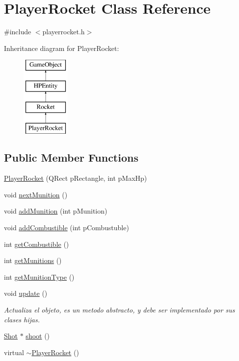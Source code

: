 \hypertarget{class_player_rocket}{\section{Player\-Rocket Class Reference}
\label{class_player_rocket}
}


{\ttfamily \#include $<$playerrocket.\-h$>$}

Inheritance diagram for Player\-Rocket\-:\begin{figure}[H]
\begin{center}
\leavevmode
\includegraphics[height=4.000000cm]{class_player_rocket}
\end{center}
\end{figure}
\subsection*{Public Member Functions}
\begin{DoxyCompactItemize}
\item 
\hyperlink{class_player_rocket_a662448cb29201a9155de519f4563fac3}{Player\-Rocket} (Q\-Rect p\-Rectangle, int p\-Max\-Hp)
\item 
void \hyperlink{class_player_rocket_a61a775b8b7f8bf920e748eaf44af1a49}{next\-Munition} ()
\item 
void \hyperlink{class_player_rocket_a93f9d838d9b21c11ab9a2fe0176f9ff6}{add\-Munition} (int p\-Munition)
\item 
void \hyperlink{class_player_rocket_ae7bf457ff4f9c794f9cf9f8cfadf4104}{add\-Combustible} (int p\-Combustuble)
\item 
int \hyperlink{class_player_rocket_a0761ec562eed1e41ea87bff255b73090}{get\-Combustible} ()
\item 
int \hyperlink{class_player_rocket_a1c7d7b49f3ba84be78aae03201ad338c}{get\-Munitions} ()
\item 
int \hyperlink{class_player_rocket_ab9f347b5080e6db3e20f79030f50f3d8}{get\-Munition\-Type} ()
\item 
void \hyperlink{class_player_rocket_a158f4ff0dd89fd4075688fa2b7d9e693}{update} ()
\begin{DoxyCompactList}\small\item\em Actualiza el objeto, es un metodo abstracto, y debe ser implementado por sus clases hijas. \end{DoxyCompactList}\item 
\hyperlink{class_shot}{Shot} $\ast$ \hyperlink{class_player_rocket_a1277f01884b2b1a68e312228e916805a}{shoot} ()
\item 
virtual \hyperlink{class_player_rocket_aa081b938fd194297b94042efa8364c23}{$\sim$\-Player\-Rocket} ()
\end{DoxyCompactItemize}
